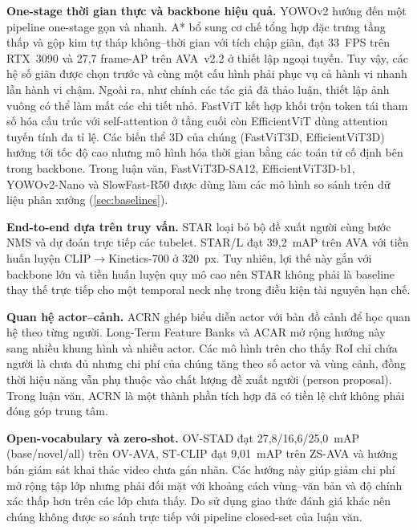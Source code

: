 \textbf{One-stage thời gian thực và backbone hiệu quả.} YOWOv2 \cite{yang2023yowov2} hướng đến một pipeline one-stage gọn và nhanh. A* \cite{kim2024astar} bổ sung cơ chế tổng hợp đặc trưng tầng thấp và gộp kim tự tháp không--thời gian với tích chập giãn, đạt 33~FPS trên RTX~3090 và 27,7 frame-AP trên AVA~v2.2 ở thiết lập ngoại tuyến. Tuy vậy, các hệ số giãn được chọn trước và cùng một cấu hình phải phục vụ cả hành vi nhanh lẫn hành vi chậm. Ngoài ra, như chính các tác giả đã thảo luận, thiết lập ảnh vuông có thể làm mất các chi tiết nhỏ. FastViT \cite{vasu2023fastvit} kết hợp khối trộn token tái tham số hóa cấu trúc với self-attention ở tầng cuối còn EfficientViT \cite{cai2023efficientvit} dùng attention tuyến tính đa tỉ lệ. Các biến thể 3D của chúng (FastViT3D, EfficientViT3D) hướng tới tốc độ cao nhưng mô hình hóa thời gian bằng các toán tử cố định bên trong backbone. Trong luận văn, FastViT3D-SA12, EfficientViT3D-b1, YOWOv2-Nano và SlowFast-R50 được dùng làm các mô hình so sánh trên dữ liệu phân xưởng (\cref{sec:baselines}).

\textbf{End-to-end dựa trên truy vấn.} STAR \cite{gritsenko2024star} loại bỏ bộ đề xuất người cùng bước NMS và dự đoán trực tiếp các tubelet. STAR/L đạt 39,2~mAP trên AVA với tiền huấn luyện CLIP$\to$Kinetics-700 ở 320~px. Tuy nhiên, lợi thế này gắn với backbone lớn và tiền huấn luyện quy mô cao nên STAR không phải là baseline thay thế trực tiếp cho một temporal neck nhẹ trong điều kiện tài nguyên hạn chế.

\textbf{Quan hệ actor--cảnh.} ACRN \cite{sun2018acrn} ghép biểu diễn actor với bản đồ cảnh để học quan hệ theo từng người. Long-Term Feature Banks \cite{wu2019lfb} và ACAR \cite{pan2021acar} mở rộng hướng này sang nhiều khung hình và nhiều actor. Các mô hình trên cho thấy RoI chỉ chứa người là chưa đủ nhưng chi phí của chúng tăng theo số actor và vùng cảnh, đồng thời hiệu năng vẫn phụ thuộc vào chất lượng đề xuất người (person proposal). Trong luận văn, ACRN là một thành phần tích hợp đã có tiền lệ chứ không phải đóng góp trung tâm.

\textbf{Open-vocabulary và zero-shot.} OV-STAD \cite{wu2024ovstad} đạt 27,8/16,6/25,0~mAP (base/novel/all) trên OV-AVA, ST-CLIP \cite{huang2025stclip} đạt 9,01~mAP trên ZS-AVA và hướng bán giám sát \cite{kwon2025semisup} khai thác video chưa gán nhãn. Các hướng này giúp giảm chi phí mở rộng tập lớp nhưng phải đối mặt với khoảng cách vùng--văn bản và độ chính xác thấp hơn trên các lớp chưa thấy. Do sử dụng giao thức đánh giá khác nên chúng không được so sánh trực tiếp với pipeline closed-set của luận văn.

